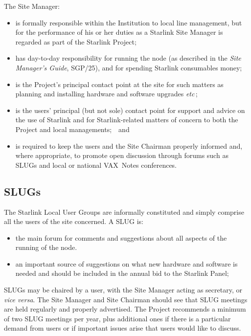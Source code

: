 \documentclass[twoside,11pt]{article}
\newcommand{\xref}[3]{#1}
\begin{document}
The Site Manager:
\begin{itemize}
\item is formally responsible within the Institution to local line
      management, but for the performance of his or her
      duties as a Starlink Site Manager
      is regarded as part of the Starlink Project;
\item has day-to-day responsibility for
      running the node (as described in the {\it Site Manager's Guide},
      \xref{SGP/25}{sgp25}{}), and for spending Starlink consumables money;
\item is the Project's principal contact point at the site for such
      matters as planning and installing hardware and
      software upgrades {\it etc}\,;
\item is the users' principal (but not sole) contact point for support and
      advice on the use of Starlink
      and for Starlink-related matters of concern to both the
      Project and local managements;~~and
\item is required to keep the users and the Site Chairman
      properly informed and, where appropriate, to promote open
      discussion through forums such as SLUGs and local or national VAX~Notes
      conferences.
\end{itemize}

\subsection{SLUGs}

The Starlink Local User Groups are informally constituted and
simply comprise all the users of the site concerned.  A SLUG is:
\begin{itemize}
\item the main forum for comments and suggestions
      about all aspects of the running of the node.
\item an important source of suggestions on what
      new hardware and software is needed and should be included
      in the annual bid to the Starlink Panel;
\end{itemize}
SLUGs may be chaired by a user, with the Site Manager acting
as secretary, or {\it vice versa}.  The Site Manager and
Site Chairman should see that SLUG meetings are held regularly
and properly advertised.  The Project recommends a minimum of two
SLUG meetings per year, plus
additional ones if there is a particular demand from users or if
important issues arise that users would like to discuss.
\end{document}
